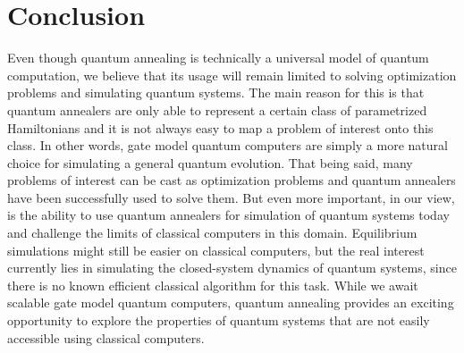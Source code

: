 \documentclass[12pt,a4paper]{article}
\begin{document}
\section{Conclusion} \label{sec:conclusion}
\hspace*{0.3cm}
Even though quantum annealing is technically a universal model of quantum computation, we believe that its usage will
remain limited to solving optimization problems and simulating quantum systems. The main reason for this is that
quantum annealers are only able to represent a certain class of parametrized Hamiltonians and it is not always
easy to map a problem of interest onto this class. In other words, gate model quantum computers are simply
a more natural choice for simulating a general quantum evolution. That being said, many problems of interest
can be cast as optimization problems and quantum annealers have been successfully used to solve them.
But even more important, in our view, is the ability to use quantum annealers for simulation of quantum systems
today and challenge the limits of classical computers in this domain. Equilibrium simulations might still
be easier on classical computers, but the real interest currently lies in simulating the closed-system
dynamics of quantum systems, since there is no known efficient classical algorithm for this task.
While we await scalable gate model quantum computers, quantum annealing provides an exciting opportunity
to explore the properties of quantum systems that are not easily accessible using classical computers.


\printbibliography


\end{document}
